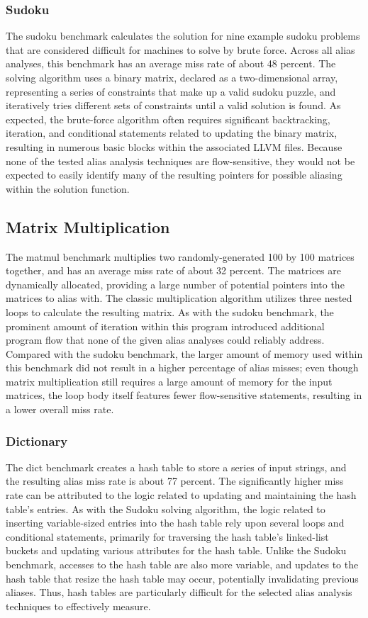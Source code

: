 \subsubsection{Sudoku}
The sudoku benchmark calculates the solution for nine example sudoku problems that are considered difficult for machines to solve by brute force. Across all alias analyses, this benchmark has an average miss rate of about 48 percent. The solving algorithm uses a binary matrix, declared as a two-dimensional array, representing a series of constraints that make up a valid sudoku puzzle, and iteratively tries different sets of constraints until a valid solution is found. As expected, the brute-force algorithm often requires significant backtracking, iteration, and conditional statements related to updating the binary matrix, resulting in numerous basic blocks within the associated LLVM files. Because none of the tested alias analysis techniques are flow-sensitive, they would not be expected to easily identify many of the resulting pointers for possible aliasing within the solution function.

\subsection{Matrix Multiplication}
The matmul benchmark multiplies two randomly-generated 100 by 100 matrices together, and has an average miss rate of about 32 percent. The matrices are dynamically allocated, providing a large number of potential pointers into the matrices to alias with. The classic multiplication algorithm utilizes three nested loops to calculate the resulting matrix. As with the sudoku benchmark, the prominent amount of iteration within this program introduced additional program flow that none of the given alias analyses could reliably address. Compared with the sudoku benchmark, the larger amount of memory used within this benchmark did not result in a higher percentage of alias misses; even though matrix multiplication still requires a large amount of memory for the input matrices, the loop body itself features fewer flow-sensitive statements, resulting in a lower overall miss rate.

\subsubsection{Dictionary}
The dict benchmark creates a hash table to store a series of input strings, and the resulting alias miss rate is about 77 percent. The significantly higher miss rate can be attributed to the logic related to updating and maintaining the hash table's entries. As with the Sudoku solving algorithm, the logic related to inserting variable-sized entries into the hash table rely upon several loops and conditional statements, primarily for traversing the hash table's linked-list buckets and updating various attributes for the hash table. Unlike the Sudoku benchmark, accesses to the hash table are also more variable, and updates to the hash table that resize the hash table may occur, potentially invalidating previous aliases. Thus, hash tables are particularly difficult for the selected alias analysis techniques to effectively measure.

